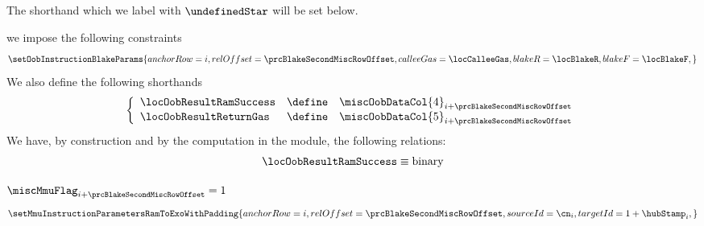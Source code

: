 \begin{description}
\begin{description}
				\saNote{} The shorthand \locOobResultRamSuccess{} which we label with $\undefinedStar$ will be set below.
			\item[\underline{Setting \oobMod{} values and shorthands:}] 
				we impose the following constraints
				\[
					\setOobInstructionBlakeParams {
						anchorRow   = i                            ,
						relOffset   = \prcBlakeSecondMiscRowOffset ,
						calleeGas   = \locCalleeGas                ,
						blakeR      = \locBlakeR                   ,
						blakeF      = \locBlakeF                   ,
					}
					\label{hub: instruction handling: call: precompiles: blake: hub success call}
				\]
				We also define the following shorthands
				\[
					\left\{ \begin{array}{lcl} \label{hub: instruction handling: call: precompiles: blake: shorthands}
						\locOobResultRamSuccess      & \define & \miscOobDataCol{4}_{i + \prcBlakeSecondMiscRowOffset} \\
						\locOobResultReturnGas       & \define & \miscOobDataCol{5}_{i + \prcBlakeSecondMiscRowOffset} \\
					\end{array} \right.
				\]
				\saNote{} We have, by construction and by the computation in the \oobMod{} module, the following relations:
				\[
					\locOobResultRamSuccess \equiv \text{binary} 
				\]
			\item[\underline{Setting \mmuMod{} values:}]
				\If $\miscMmuFlag_{i + \prcBlakeSecondMiscRowOffset} = 1$ \Then
				\[
					\setMmuInstructionParametersRamToExoWithPadding {
						anchorRow       = i                                ,
						relOffset       = \prcBlakeSecondMiscRowOffset     ,
						sourceId        = \cn_{i}                          ,
						targetId        = 1 + \hubStamp_{i}                ,
}\]
\end{description}
\end{description}
